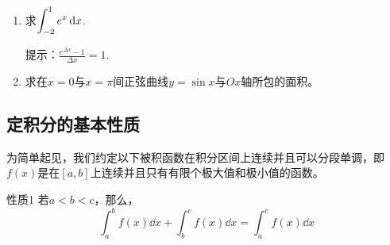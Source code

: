\begin{ex}
\begin{enumerate}
    \item 求$\displaystyle\int^1_{-2}e^x\,{\rm d} x$. 

提示：$\frac{e^{\Delta x}-1}{\Delta x}=1$.    

\item 求在$x=0$与$x=\pi$间正弦曲线$y=\sin x$与$Ox$轴所包的面积。
\end{enumerate}
\end{ex}    

\subsection{定积分的基本性质}

为简单起见，我们约定以下被积函数在积分区间上连续并且可以分段单调，即$f(x)$是在$[a,b]$上连续并且只有有限个极大值和极小值的函数。

\begin{blk}{性质1}
若$a<b<c$，那么，
\[\int^b_a f(x)\dd x+\int^c_b f(x)\dd x=\int^c_a f(x)\dd x\]
\end{blk}

